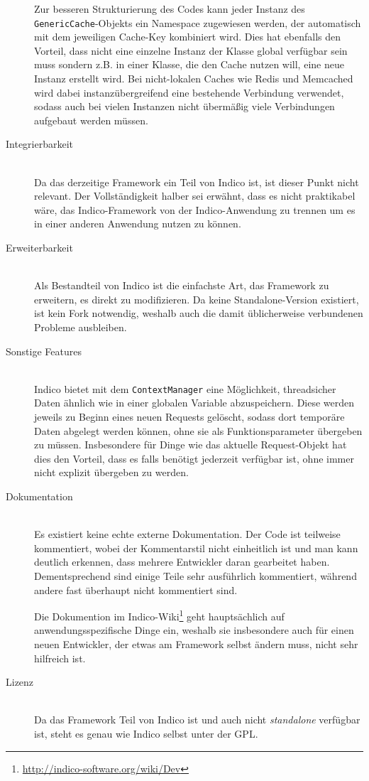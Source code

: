 \begin{description}
Zur besseren Strukturierung des Codes kann jeder Instanz des \lstinline{GenericCache}-Objekts ein
Namespace zugewiesen werden, der automatisch mit dem jeweiligen Cache-Key kombiniert wird. Dies hat
ebenfalls den Vorteil, dass nicht eine einzelne Instanz der Klasse global verfügbar sein muss
sondern z.B. in einer Klasse, die den Cache nutzen will, eine neue Instanz erstellt wird.
Bei nicht-lokalen Caches wie Redis und Memcached wird dabei instanzübergreifend eine bestehende
Verbindung verwendet, sodass auch bei vielen Instanzen nicht übermäßig viele Verbindungen aufgebaut
werden müssen.


\item[Integrierbarkeit] \hfill \\
Da das derzeitige Framework ein Teil von Indico ist, ist dieser Punkt nicht relevant. Der
Vollständigkeit halber sei erwähnt, dass es nicht praktikabel wäre, das Indico-Framework von der
Indico-Anwendung zu trennen um es in einer anderen Anwendung nutzen zu können.


\item[Erweiterbarkeit] \hfill \\
Als Bestandteil von Indico ist die einfachste Art, das Framework zu erweitern, es direkt zu
modifizieren. Da keine Standalone-Version existiert, ist kein Fork notwendig, weshalb auch die damit
üblicherweise verbundenen Probleme ausbleiben.


\item[Sonstige Features] \hfill \\
Indico bietet mit dem \lstinline{ContextManager} eine Möglichkeit, threadsicher Daten ähnlich wie in
einer globalen Variable abzuspeichern. Diese werden jeweils zu Beginn eines neuen Requests gelöscht,
sodass dort temporäre Daten abgelegt werden können, ohne sie als Funktionsparameter übergeben zu
müssen. Insbesondere für Dinge wie das aktuelle Request-Objekt hat dies den Vorteil, dass es falls
benötigt jederzeit verfügbar ist, ohne immer nicht explizit übergeben zu werden.


\item[Dokumentation] \hfill \\
Es existiert keine echte externe Dokumentation. Der Code ist teilweise kommentiert, wobei der
Kommentarstil nicht einheitlich ist und man kann deutlich erkennen, dass mehrere Entwickler daran
gearbeitet haben. Dementsprechend sind einige Teile sehr ausführlich kommentiert, während andere
fast überhaupt nicht kommentiert sind.

Die Dokumention im Indico-Wiki\footnote{\href{http://indico-software.org/wiki/Dev}{http://indico-software.org/wiki/Dev}}
geht hauptsächlich auf anwendungsspezifische Dinge ein, weshalb sie insbesondere auch für einen
neuen Entwickler, der etwas am Framework selbst ändern muss, nicht sehr hilfreich ist.


\item[Lizenz] \hfill \\
Da das Framework Teil von Indico ist und auch nicht \emph{standalone} verfügbar ist, steht es genau
wie Indico selbst unter der GPL.

\end{description}
